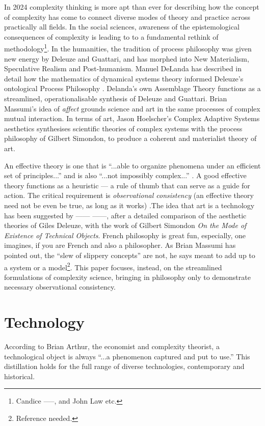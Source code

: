 \documentclass[letterpaper]{article}
\begin{document}
    In 2024 complexity thinking is more apt than ever for describing how the concept of complexity has come to connect diverse modes of theory and practice across practically all fields. In the social sciences, awareness of the epistemological consequences of complexity is leading to to a fundamental rethink of methodology\footnote{
        Candice -----, and John Law etc.
    }. In the humanities, the tradition of process philosophy was given new energy by Deleuze and Guattari, and has morphed into New Materialism, Speculative Realism and Post-humanism. Manuel DeLanda has described in detail how the mathematics of dynamical systems theory informed Deleuze's ontological Process Philosophy \citep{DeLandaIntnsvSci2013}. Delanda's own Assemblage Theory functions as a streamlined, operationalisable synthesis of Deleuze and Guattari. Brian Massumi's idea of \emph{affect} grounds science and art in the same processes of complex mutual interaction. In terms of art, Jason Hoelscher's Complex Adaptive Systems aesthetics synthesises scientific theories of complex systems with the process philosophy of Gilbert Simondon, to produce a coherent and materialist theory of art.

    An effective theory is one that is “...able to organize phenomena under an efficient set of principles...” and is also “...not impossibly complex...” \citep[p.1]{WellsEffctvThrs2012}. A good effective theory functions as a heuristic — a rule of thumb that can serve as a guide for action. The critical requirement is \emph{observational consistency} (an effective theory need not be even be true, as long as it works) \citep[p.71]{WellsEffctvThrs2012}.The idea that art is a technology has been suggested by ------ ------, after a detailed comparison of the aesthetic theories of Giles Deleuze, with the work of Gilbert Simondon \emph{On the Mode of Existence of Technical Objects}. French philosophy is great fun, especially, one imagines, if you are French and also a philosopher. As Brian Massumi has pointed out, the “slew of slippery concepts” are not, he says meant to add up to a system or a model\footnote{Reference needed.}. This paper focuses, instead, on the streamlined formulations of complexity science, bringing in philosophy only to demonstrate necessary observational consistency.
    
\section{Technology}

    According to Brian Arthur, the economist and complexity theorist, a technological object is always “...a phenomenon captured and put to use.” \citep[p.53]{theNatureOfTechnology2009} This distillation holds for the full range of diverse technologies, contemporary and historical.
\end{document}
